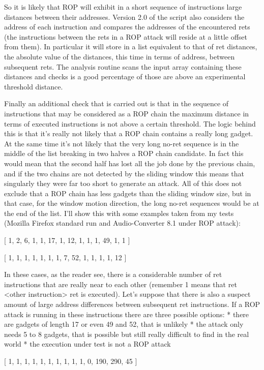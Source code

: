 \documentclass[Lau,binding=0.6cm]{sapthesis}
\begin{document}
So it is likely that ROP will exhibit in a short sequence of instructions large distances between their addresses. 
Version 2.0 of the script also considers the address of each instruction and compares the addresses of the encountered rets (the instructions between the rets in a ROP attack will reside at a little offset from them). In particular it will store in a list equivalent to that of ret distances, the absolute value of the distances, this time in terms of address, between subsequent rets. The analysis routine scans the input array containing these distances and checks is a good percentage of those are above an experimental threshold distance.

Finally an additional check that is carried out is that in the sequence of instructions that may be considered as a ROP chain the maximum distance in terms of executed instructions is not above a certain threshold. The logic behind this is that it’s really not likely that a ROP chain contains a really long gadget. At the same time it’s not likely that the very long no-ret sequence is in the middle of the list breaking in two halves a ROP chain candidate. In fact this would mean that the second half has lost all the job done by the previous chain, and if the two chains are not detected by the sliding window this means that singularly they were far too short to generate an attack. All of this does not exclude that a ROP chain has less gadgets than the sliding window size, but in that case, for the window motion direction, the long no-ret sequences would be at the end of the list.
I’ll show this with some examples taken from my tests (Mozilla Firefox standard run and Audio-Converter 8.1 under ROP attack):

[ 1, 2, 6, 1, 1, 17, 1, 12, 1, 1, 1, 49, 1, 1 ]

[ 1, 1, 1, 1, 1, 1, 1, 7, 52, 1, 1, 1, 1, 12 ]

In these cases, as the reader see, there is a considerable number of ret instructions that are really near to each other (remember 1 means that ret <other instruction> ret is executed). Let’s suppose that there is also a suspect amount of large address differences between subsequent ret instructions. If a ROP attack is running in these instructions there are three possible options:
* there are gadgets of length 17 or even 49 and 52, that is unlikely
* the attack only needs 5 to 8 gadgets, that is possible but still really difficult to find in the real world
* the execution under test is not a ROP attack

[ 1, 1, 1, 1, 1, 1, 1, 1, 1, 1, 0, 190, 290, 45 ]
\end{document}
